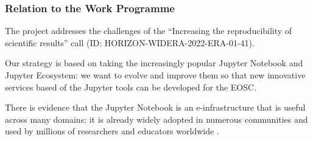 %

\label{sect:workprogramme}
\subsubsection{Relation to the Work Programme}

The \TheProject project addresses the challenges of the
``Increasing the reproducibility of scientific results'' call (ID: HORIZON-WIDERA-2022-ERA-01-41).

Our strategy is based on taking the increasingly popular Jupyter
Notebook and Jupyter Ecosystem: we want to evolve and improve them
so that new innovative services based of the Jupyter tools can be developed for
the EOSC.
\medskip


There is evidence that the Jupyter Notebook is an e-infrastructure
that is useful across many domains: it is already widely adopted in
numerous communities and used by millions of researchers and educators worldwide
\cite{jupyter-grant}.

